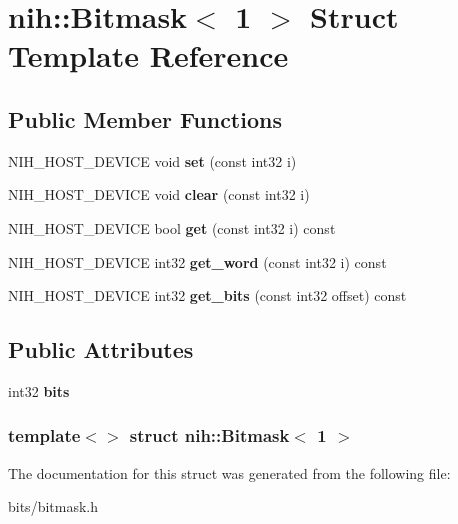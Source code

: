 \hypertarget{structnih_1_1_bitmask_3_011_01_4}{
\section{nih\-:\-:\-Bitmask$<$ 1 $>$ \-Struct \-Template \-Reference}
\label{structnih_1_1_bitmask_3_011_01_4}
}
\subsection*{\-Public \-Member \-Functions}
\begin{DoxyCompactItemize}
\item 
\hypertarget{structnih_1_1_bitmask_3_011_01_4_a2858302dab752591497b780a4068606e}{
\-N\-I\-H\-\_\-\-H\-O\-S\-T\-\_\-\-D\-E\-V\-I\-C\-E void {\bfseries set} (const int32 i)}
\label{structnih_1_1_bitmask_3_011_01_4_a2858302dab752591497b780a4068606e}

\item 
\hypertarget{structnih_1_1_bitmask_3_011_01_4_af7d103f3e1350437258a698ac39d1c03}{
\-N\-I\-H\-\_\-\-H\-O\-S\-T\-\_\-\-D\-E\-V\-I\-C\-E void {\bfseries clear} (const int32 i)}
\label{structnih_1_1_bitmask_3_011_01_4_af7d103f3e1350437258a698ac39d1c03}

\item 
\hypertarget{structnih_1_1_bitmask_3_011_01_4_aa0b3d4b7dc3d3056a3e72bdcba23e662}{
\-N\-I\-H\-\_\-\-H\-O\-S\-T\-\_\-\-D\-E\-V\-I\-C\-E bool {\bfseries get} (const int32 i) const }
\label{structnih_1_1_bitmask_3_011_01_4_aa0b3d4b7dc3d3056a3e72bdcba23e662}

\item 
\hypertarget{structnih_1_1_bitmask_3_011_01_4_a755daa2cee0eef284c404208b77aca08}{
\-N\-I\-H\-\_\-\-H\-O\-S\-T\-\_\-\-D\-E\-V\-I\-C\-E int32 {\bfseries get\-\_\-word} (const int32 i) const }
\label{structnih_1_1_bitmask_3_011_01_4_a755daa2cee0eef284c404208b77aca08}

\item 
\hypertarget{structnih_1_1_bitmask_3_011_01_4_a79a87d98c90082bca8dce417441c57f2}{
\-N\-I\-H\-\_\-\-H\-O\-S\-T\-\_\-\-D\-E\-V\-I\-C\-E int32 {\bfseries get\-\_\-bits} (const int32 offset) const }
\label{structnih_1_1_bitmask_3_011_01_4_a79a87d98c90082bca8dce417441c57f2}

\end{DoxyCompactItemize}
\subsection*{\-Public \-Attributes}
\begin{DoxyCompactItemize}
\item 
\hypertarget{structnih_1_1_bitmask_3_011_01_4_a5a95ae7e543ea3cbfeb52f5a3ea087bb}{
int32 {\bfseries bits}}
\label{structnih_1_1_bitmask_3_011_01_4_a5a95ae7e543ea3cbfeb52f5a3ea087bb}

\end{DoxyCompactItemize}
\subsubsection*{template$<$$>$ struct nih\-::\-Bitmask$<$ 1 $>$}



\-The documentation for this struct was generated from the following file\-:\begin{DoxyCompactItemize}
\item 
bits/bitmask.\-h\end{DoxyCompactItemize}
